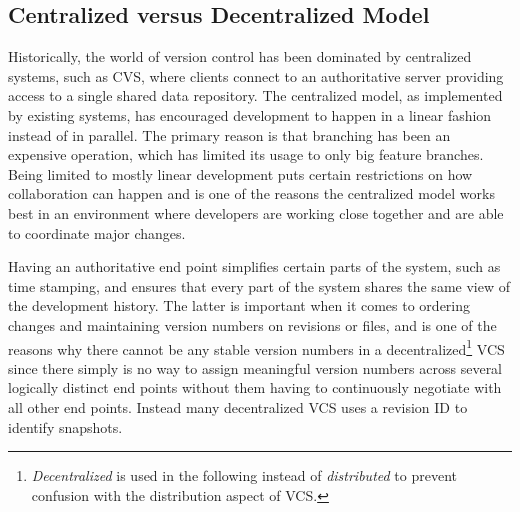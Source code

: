 \subsection{Centralized versus Decentralized Model}

% 
% 

Historically, the world of version control has been dominated by
centralized systems, such as CVS, where clients connect to an
authoritative server providing access to a single shared data
repository. The centralized model, as implemented by existing systems,
has encouraged development to happen in a linear fashion instead of in
parallel. The primary reason is that branching has been an expensive
operation, which has limited its usage to only big feature branches.
Being limited to mostly linear development puts certain restrictions
on how collaboration can happen and is one of the reasons the
centralized model works best in an environment where developers are
working close together and are able to coordinate major changes. 

Having an authoritative end point simplifies certain parts of the
system, such as time stamping, and ensures that every part of the
system shares the same view of the development history. The latter is
important when it comes to ordering changes and maintaining version
numbers on revisions or files, and is one of the reasons why there cannot be any stable version numbers in a
decentralized\footnote{\emph{Decentralized} is used in the following
instead of \emph{distributed} to prevent confusion with the
distribution aspect of VCS.} VCS since there simply is no way to
assign meaningful version numbers across several logically distinct
end points without them having to continuously negotiate with all other
end points. Instead many decentralized VCS uses a revision ID to
identify snapshots.

